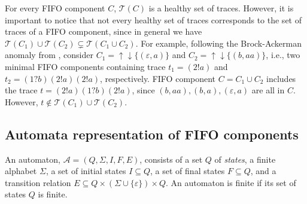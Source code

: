 \documentclass{llncs}
\newcommand{\udarrow}{{\uparrow\downarrow}}
\newcommand{\out}[1]{}
\newcommand{\df}[1]{\ \stackrel{\mathtt{def}}{#1}\ }
\begin{document}
For every FIFO component $C$, $\mathcal{T}(C)$ is a healthy set of
traces. However, it is important to notice that not every healthy set
of traces corresponds to the set of traces of a FIFO component, since
in general we have $\mathcal{T}(C_1)\cup\mathcal{T}(C_2) \subsetneq
\mathcal{T}(C_1\cup C_2)$.  For example, following the Brock-Ackerman
anomaly from \cite{ba-81}, consider $C_1=
{\udarrow}\{(\varepsilon,a)\}$ and $C_2 ={\udarrow}\{(b,aa)\}$, i.e.,
two minimal FIFO components containing trace $t_1=(2!a)$ and
$t_2=(1?b)(2!a)(2!a)$, respectively.  FIFO component $C=C_1\cup C_2$
includes the trace $t=(2!a)(1?b)(2!a)$, since
$(b,aa),(b,a),(\varepsilon,a)$ are all in $C$.  However, $t\notin
\mathcal{T}(C_1)\cup \mathcal{T}(C_2)$.

\out{
By $\max{T}$ we denote all maximum elements of $T$ with respect to
$\preceq$, i.e.,
\[ 
\max{T} \df{=} \{t \in T \mid \forall t'\in T ~ t\preceq t'
\Rightarrow t\simeq t'\}.
\]
  
The equivalence relation over traces generated by $\preceq$ will be
denoted by $\simeq$.
  
Within an equivalence class $[|t|]\df{=}\{x\in (\{1,\ldots,m+n\}\times
S)^\ast\mid x\simeq t\}$ the natural candidate as a
representative\footnote{The choice of the representative is arbitrary
  as long as we take it from the finite set of the shortest elements
  of $[|t|]$.} of $[|t|]$, denoted by $\mathrm{rep}([|t|])$, is a
trace which is of the shortest length and which, for example, reads
and writes in order of port numbers. E.g., for $t=2?a\cdot 1?a\cdot
4!a\cdot 3!b\cdot 1?b$, we would have $\mathrm{rep}([|t|]) = 1?a\cdot
2?a\cdot 3!b\cdot 4!a$.
  
We denote $\mathrm{rep}(T)$ the set of representatives of the
equivalence classes generated by elements of $T$, i.e.,
$\mathrm{rep}(T) \df{=} \{\mathrm{rep}([|t|]) \mid t\in\max{T}\}$.
Notice that in general ${\udarrow}\mathrm{rep}(T)\subsetneq
{\udarrow}T$. For example, ${\udarrow}\mathrm{rep}(T)\neq
{\udarrow}T$, for $T=(3!a)^{\ast}$, since $\max{T}=\emptyset$.
}

\subsection{Automata representation of FIFO components}
\label{sec:fifo-state-machine}

An automaton, $\mathcal{A}=(Q,\Sigma,I,F,E)$, consists of a set $Q$ of
\emph{states}, a finite alphabet $\Sigma$, a set of initial states
$I\subseteq Q$, a set of final states $F\subseteq Q$, and a transition
relation $E\subseteq Q\times(\Sigma\cup\{\varepsilon\})\times Q$. An
automaton is finite if its set of states $Q$ is finite.
\end{document}
